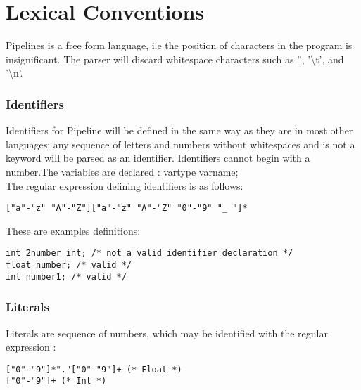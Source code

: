 \documentclass[./LRM_main.tex]{subfiles}
\begin{document}
\section{Lexical Conventions}

Pipelines is a free form language, i.e the position of characters in the program is insignificant. The parser will discard whitespace characters such as '', '\textbackslash t', and '\textbackslash n'. 

\subsubsection{Identifiers}
Identifiers for Pipeline will be defined in the same way as they are in most other languages; any sequence of letters and numbers without whitespaces and is not a keyword will be parsed as an identifier. Identifiers cannot begin with a number.The variables are declared : vartype varname;  \\
The regular expression defining identifiers is as follows:  

\begin{lstlisting}
["a"-"z" "A"-"Z"]["a"-"z" "A"-"Z" "0"-"9" "_ "]*
\end{lstlisting}

These are examples definitions:

\begin{lstlisting}
int 2number int; /* not a valid identifier declaration */ 
float number; /* valid */ 
int number1; /* valid */
\end{lstlisting}

\subsubsection{Literals}
Literals are sequence of numbers, which may be identified with the regular expression : 
\begin{lstlisting}
["0"-"9"]*"."["0"-"9"]+ (* Float *)
["0"-"9"]+ (* Int *) 
\end{lstlisting}
\end{document}
